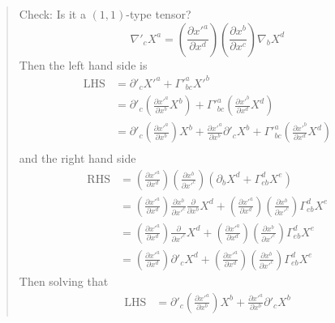 \begin{quote}
	Check: Is it a $(1,1)$-type tensor?
\begin{equation}
\nabla'_{c}X^{a} = \left(\frac{\partial x'^{a}}{\partial x^{d}}\right)\left(\frac{\partial x^{b}}{\partial x^{c}}\right)\nabla_{b}X^{d}
\end{equation}
Then the left hand side is
\begin{equation}
\begin{aligned}
\mathrm{LHS}
&= \partial'_{c} X'^{a} + \Gamma'^{a}_{bc}X'^{b}\\
&= \partial'_{c}\left(\frac{\partial x'^{a}}{\partial x^{b}}X^{b}\right)
+ \Gamma'^{a}_{bc} \left(\frac{\partial x'^{b}}{\partial x^{d}}X^{d}\right)\\
&= \partial'_{c}\left(\frac{\partial x'^{a}}{\partial x^{b}}\right) X^{b}
+  \frac{\partial x'^{a}}{\partial x^{b}}\partial'_{c}X^{b}
+ \Gamma'^{a}_{bc} \left(\frac{\partial x'^{b}}{\partial x^{d}}X^{d}\right)\\
\end{aligned}
\end{equation}
and the right hand side
\begin{equation}
\begin{aligned}
\mathrm{RHS}
&=\left(\frac{\partial x'^{a}}{\partial x^{d}}\right) \left(\frac{\partial x^{b}}{\partial x'^{c}}\right) \left(\partial_{b}X^{d} + \Gamma^{d}_{eb}X^{e}\right)\\
&=\left(\frac{\partial x'^{a}}{\partial x^{d}}\right) \frac{\partial x^{b}}{\partial x'^{c}} \frac{\partial}{\partial x^{b}}X^{d}
+ \left(\frac{\partial x'^{a}}{\partial x^{d}}\right) \left(\frac{\partial x^{b}}{\partial x'^{c}}\right)\Gamma^{d}_{eb}X^{e}\\
&=\left(\frac{\partial x'^{a}}{\partial x^{d}}\right)\frac{\partial}{\partial x'^{c}}X^{d}
+ \left(\frac{\partial x'^{a}}{\partial x^{d}}\right) \left(\frac{\partial x^{b}}{\partial x'^{c}}\right)\Gamma^{d}_{eb}X^{e}\\
&=\left(\frac{\partial x'^{a}}{\partial x^{d}}\right)\partial'_{c}X^{d}
+ \left(\frac{\partial x'^{a}}{\partial x^{d}}\right) \left(\frac{\partial x^{b}}{\partial x'^{c}}\right)\Gamma^{d}_{eb}X^{e}
\end{aligned}
\end{equation}
Then solving that
\begin{equation}
\begin{aligned}
\mathrm{LHS}
&= \partial'_{c}\left(\frac{\partial x'^{a}}{\partial x^{b}}\right) X^{b}
+  \frac{\partial x'^{a}}{\partial x^{b}}\partial'_{c}X^{b}

\end{aligned}
\end{equation}
\end{quote}
